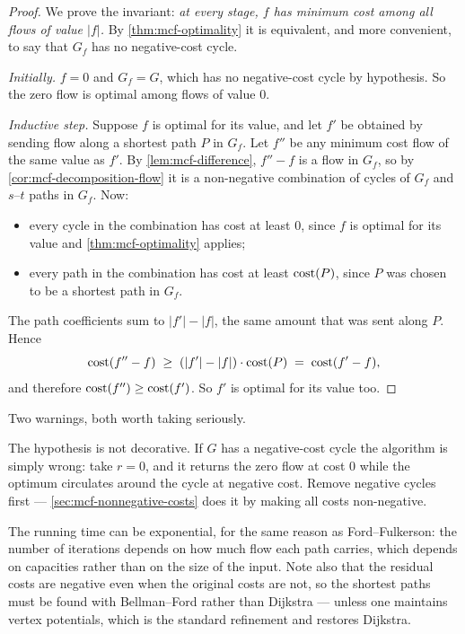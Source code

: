 \begin{proof}
We prove the invariant: \emph{at every stage, $f$ has minimum cost among all
flows of value $|f|$.} By \cref{thm:mcf-optimality} it is equivalent, and more
convenient, to say that $G_f$ has no negative-cost cycle.

\emph{Initially.} $f = 0$ and $G_f = G$, which has no negative-cost cycle by
hypothesis. So the zero flow is optimal among flows of value $0$.

\emph{Inductive step.} Suppose $f$ is optimal for its value, and let $f'$ be
obtained by sending flow along a shortest path $P$ in $G_f$. Let $f''$ be any
minimum cost flow of the same value as $f'$. By \cref{lem:mcf-difference},
$f'' - f$ is a flow in $G_f$, so by \cref{cor:mcf-decomposition-flow} it is a
non-negative combination of cycles of $G_f$ and $s$--$t$ paths in $G_f$. Now:
\begin{itemize}[nosep]
  \item every cycle in the combination has cost at least $0$, since $f$ is
        optimal for its value and \cref{thm:mcf-optimality} applies;
  \item every path in the combination has cost at least $\operatorname{cost}(P)$, since $P$
        was chosen to be a shortest path in $G_f$.
\end{itemize}
The path coefficients sum to $|f'| - |f|$, the same amount that was sent along
$P$. Hence
\[ \operatorname{cost}(f'' - f) \;\ge\; (|f'|-|f|)\cdot \operatorname{cost}(P) \;=\; \operatorname{cost}(f'-f), \]
and therefore $\operatorname{cost}(f'') \ge \operatorname{cost}(f')$. So $f'$ is optimal for its value too.
\end{proof}

Two warnings, both worth taking seriously.

\begin{remark}
The hypothesis is not decorative. If $G$ has a negative-cost cycle the algorithm
is simply wrong: take $r = 0$, and it returns the zero flow at cost $0$ while
the optimum circulates around the cycle at negative cost. Remove negative cycles
first --- \cref{sec:mcf-nonnegative-costs} does it by making all costs
non-negative.
\end{remark}

\begin{remark}
The running time can be exponential, for the same reason as Ford--Fulkerson: the
number of iterations depends on how much flow each path carries, which depends
on capacities rather than on the size of the input. Note also that the residual
costs are negative even when the original costs are not, so the shortest paths
must be found with Bellman--Ford rather than Dijkstra --- unless one maintains
vertex potentials, which is the standard refinement and restores Dijkstra.
\end{remark}

